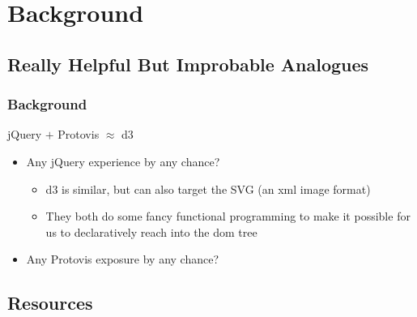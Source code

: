 \documentclass{beamer}
\begin{document}
\section{Background}

\subsection{Really Helpful But Improbable Analogues}

\begin{frame}
    \frametitle{Background}
    \begin{block}{jQuery $+$ Protovis $\approx$ d3}
\pause
        \begin{itemize}
        \item Any jQuery experience by any chance?
\pause
            \begin{itemize}
            \item d3 is similar, but can also target the SVG (an xml image format)
\pause
            \item They both do some fancy functional programming to make it possible 
                  for us to declaratively reach into the dom tree
            \end{itemize}
\pause
       \item Any Protovis exposure by any chance?
       \end{itemize}
    \end{block}
\end{frame}



\subsection{Resources}
\end{document}
